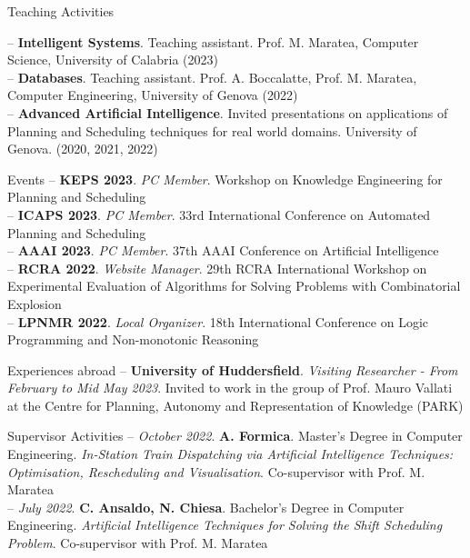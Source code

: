 \documentclass{resume} %
\begin{document}
\pagebreak

\begin{rSection}{Teaching Activities}

-- \textbf{Intelligent Systems}. Teaching assistant. Prof. M. Maratea, Computer Science, University of Calabria (2023)\\
-- \textbf{Databases}. Teaching assistant. Prof. A. Boccalatte, Prof. M. Maratea, Computer Engineering, University of Genova (2022)\\
-- \textbf{Advanced Artificial Intelligence}. Invited presentations on applications of Planning and Scheduling techniques for real world domains. University of Genova. (2020, 2021, 2022)
\end{rSection}


\begin{rSection}{Events}
-- \textbf{KEPS 2023}. \textit{PC Member}. Workshop on Knowledge Engineering for Planning and Scheduling \\
-- \textbf{ICAPS 2023}. \textit{PC Member}. 33rd International Conference on Automated Planning and Scheduling \\
-- \textbf{AAAI 2023}. \textit{PC Member}. 37th AAAI Conference on Artificial Intelligence  \\
-- \textbf{RCRA 2022}. \textit{Website Manager}. 29th RCRA International Workshop on Experimental Evaluation of Algorithms for Solving Problems with Combinatorial Explosion  \\
-- \textbf{LPNMR 2022}. \textit{Local Organizer}. 18th International Conference on Logic Programming and Non-monotonic Reasoning  
\end{rSection}

\begin{rSection}{Experiences abroad}
-- \textbf{University of Huddersfield}. \textit{Visiting Researcher - From February to Mid May 2023}. Invited to work in the group of Prof. Mauro Vallati at the Centre for Planning, Autonomy and Representation of Knowledge (PARK)  
\end{rSection}

\begin{rSection}{Supervisor Activities}
-- \textit{October 2022}. \textbf{A. Formica}. Master's Degree in Computer Engineering. \textit{In-Station Train Dispatching via Artificial Intelligence Techniques: Optimisation, Rescheduling and Visualisation}. Co-supervisor with Prof. M. Maratea\\
-- \textit{July 2022}. \textbf{C. Ansaldo, N. Chiesa}. Bachelor's Degree in Computer Engineering. \textit{Artificial Intelligence Techniques for Solving the Shift Scheduling Problem}. Co-supervisor with Prof. M. Maratea
\end{rSection}
\end{document}
